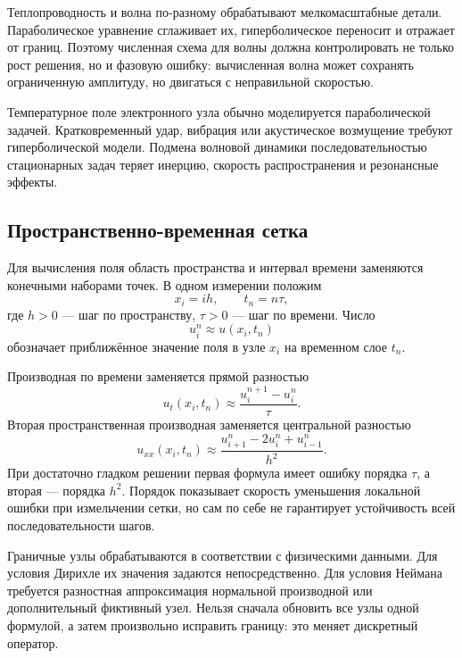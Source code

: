 Теплопроводность и волна по-разному обрабатывают мелкомасштабные детали. Параболическое уравнение сглаживает их, гиперболическое переносит и отражает от границ. Поэтому численная схема для волны должна контролировать не только рост решения, но и фазовую ошибку: вычисленная волна может сохранять ограниченную амплитуду, но двигаться с неправильной скоростью.

\begin{application}
Температурное поле электронного узла обычно моделируется параболической задачей. Кратковременный удар, вибрация или акустическое возмущение требуют гиперболической модели. Подмена волновой динамики последовательностью стационарных задач теряет инерцию, скорость распространения и резонансные эффекты.
\end{application}

\subsection{Пространственно-временная сетка}

Для вычисления поля область пространства и интервал времени заменяются конечными наборами точек. В одном измерении положим
\begin{equation}
\label{eq:space-time-grid-v04}
 x_i=ih,
 \qquad
 t_n=n\tau,
\end{equation}
где $h>0$ --- шаг по пространству, $\tau>0$ --- шаг по времени. Число
\[
 u_i^n
 \approx
 u(x_i,t_n)
\]
обозначает приближённое значение поля в узле $x_i$ на временном слое $t_n$.

Производная по времени заменяется прямой разностью
\begin{equation}
\label{eq:forward-time-difference-v04}
 u_t(x_i,t_n)
 \approx
 \frac{u_i^{n+1}-u_i^n}{\tau}.
\end{equation}
Вторая пространственная производная заменяется центральной разностью
\begin{equation}
\label{eq:centered-space-difference-v04}
 u_{xx}(x_i,t_n)
 \approx
 \frac{u_{i+1}^n-2u_i^n+u_{i-1}^n}{h^2}.
\end{equation}
При достаточно гладком решении первая формула имеет ошибку порядка $\tau$, а вторая --- порядка $h^2$. Порядок показывает скорость уменьшения локальной ошибки при измельчении сетки, но сам по себе не гарантирует устойчивость всей последовательности шагов.

Граничные узлы обрабатываются в соответствии с физическими данными. Для условия Дирихле их значения задаются непосредственно. Для условия Неймана требуется разностная аппроксимация нормальной производной или дополнительный фиктивный узел. Нельзя сначала обновить все узлы одной формулой, а затем произвольно исправить границу: это меняет дискретный оператор.

